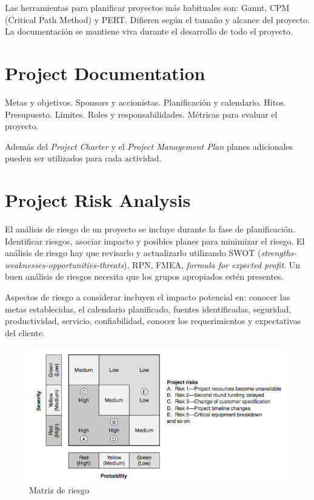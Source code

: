 \documentclass[oneside]{book}
\begin{document}
Las herramientas para planificar proyectos más habituales son: Gannt, CPM (Critical Path Method) y PERT. Difieren según el tamaño y alcance del proyecto. La documentación se mantiene viva durante el desarrollo de todo el proyecto.

\section{Project Documentation}

Metas y objetivos. Sponsors y accionistas. Planificación y calendario. Hitos. Presupuesto. Límites. Roles y responsabilidades. Métricas para evaluar el proyecto.

Además del \textit{Project Charter} y el \textit{Project Management Plan} planes adicionales pueden ser utilizados para cada actividad.

\section{Project Risk Analysis}

El análisis de riesgo de un proyecto se incluye durante la fase de planificación. Identificar riesgos, asociar impacto y posibles planes para minimizar el riesgo. El análisis de riesgo hay que revisarlo y actualizarlo utilizando SWOT (\textit{strengths-weaknesses-opportunities-threats}), RPN, FMEA, \textit{formula for expected profit}.
Un buen análisis de riesgos necesita que los grupos apropiados estén presentes.

Aspectos de riesgo a considerar incluyen el impacto potencial en: conocer las metas establecidas, el calendario planificado, fuentes identificadas, seguridad, productividad, servicio, confiabilidad, conocer los requerimientos y expectativas del cliente.

\begin{figure}[ht!]
	\centering
	\includegraphics[width=120mm]{imagenes/RiskMatrix2.png}
	\caption{Matriz de riesgo}
	\label{fig:RiskMatrix2}
\end{figure}
\end{document}
